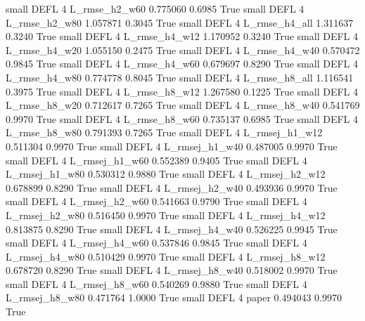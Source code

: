      small     DEFL                 4  L_rmse_h2_w60   0.775060      0.6985    True
     small     DEFL                 4  L_rmse_h2_w80   1.057871      0.3045    True
     small     DEFL                 4  L_rmse_h4_all   1.311637      0.3240    True
     small     DEFL                 4  L_rmse_h4_w12   1.170952      0.3240    True
     small     DEFL                 4  L_rmse_h4_w20   1.055150      0.2475    True
     small     DEFL                 4  L_rmse_h4_w40   0.570472      0.9845    True
     small     DEFL                 4  L_rmse_h4_w60   0.679697      0.8290    True
     small     DEFL                 4  L_rmse_h4_w80   0.774778      0.8045    True
     small     DEFL                 4  L_rmse_h8_all   1.116541      0.3975    True
     small     DEFL                 4  L_rmse_h8_w12   1.267580      0.1225    True
     small     DEFL                 4  L_rmse_h8_w20   0.712617      0.7265    True
     small     DEFL                 4  L_rmse_h8_w40   0.541769      0.9970    True
     small     DEFL                 4  L_rmse_h8_w60   0.735137      0.6985    True
     small     DEFL                 4  L_rmse_h8_w80   0.791393      0.7265    True
     small     DEFL                 4 L_rmsej_h1_w12   0.511304      0.9970    True
     small     DEFL                 4 L_rmsej_h1_w40   0.487005      0.9970    True
     small     DEFL                 4 L_rmsej_h1_w60   0.552389      0.9405    True
     small     DEFL                 4 L_rmsej_h1_w80   0.530312      0.9880    True
     small     DEFL                 4 L_rmsej_h2_w12   0.678899      0.8290    True
     small     DEFL                 4 L_rmsej_h2_w40   0.493936      0.9970    True
     small     DEFL                 4 L_rmsej_h2_w60   0.541663      0.9790    True
     small     DEFL                 4 L_rmsej_h2_w80   0.516450      0.9970    True
     small     DEFL                 4 L_rmsej_h4_w12   0.813875      0.8290    True
     small     DEFL                 4 L_rmsej_h4_w40   0.526225      0.9945    True
     small     DEFL                 4 L_rmsej_h4_w60   0.537846      0.9845    True
     small     DEFL                 4 L_rmsej_h4_w80   0.510429      0.9970    True
     small     DEFL                 4 L_rmsej_h8_w12   0.678720      0.8290    True
     small     DEFL                 4 L_rmsej_h8_w40   0.518002      0.9970    True
     small     DEFL                 4 L_rmsej_h8_w60   0.540269      0.9880    True
     small     DEFL                 4 L_rmsej_h8_w80   0.471764      1.0000    True
     small     DEFL                 4          paper   0.494043      0.9970    True
